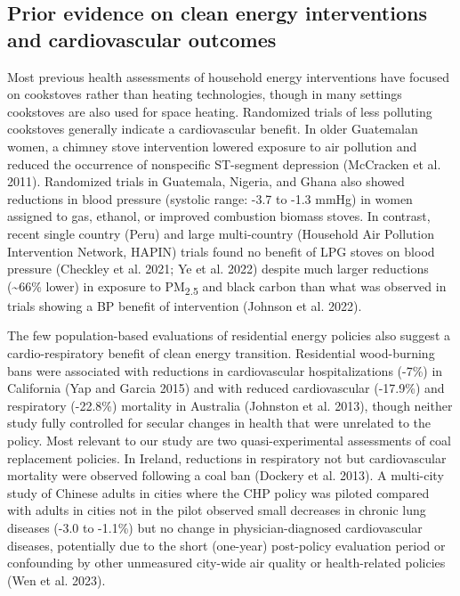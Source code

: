 \documentclass[
  letterpaper,
  DIV=11,
  numbers=noendperiod]{scrartcl}
\begin{document}
\subsection{Prior evidence on clean energy interventions and
cardiovascular
outcomes}\label{prior-evidence-on-clean-energy-interventions-and-cardiovascular-outcomes}

Most previous health assessments of household energy interventions have
focused on cookstoves rather than heating technologies, though in many
settings cookstoves are also used for space heating. Randomized trials
of less polluting cookstoves generally indicate a cardiovascular
benefit. In older Guatemalan women, a chimney stove intervention lowered
exposure to air pollution and reduced the occurrence of nonspecific
ST-segment depression (McCracken et al. 2011). Randomized trials in
Guatemala, Nigeria, and Ghana also showed reductions in blood pressure
(systolic range: -3.7 to -1.3 mmHg) in women assigned to gas, ethanol,
or improved combustion biomass stoves. In contrast, recent single
country (Peru) and large multi-country (Household Air Pollution
Intervention Network, HAPIN) trials found no benefit of LPG stoves on
blood pressure (Checkley et al. 2021; Ye et al. 2022) despite much
larger reductions (\textasciitilde66\% lower) in exposure to
PM\textsubscript{2.5} and black carbon than what was observed in trials
showing a BP benefit of intervention (Johnson et al. 2022).

The few population-based evaluations of residential energy policies also
suggest a cardio-respiratory benefit of clean energy transition.
Residential wood-burning bans were associated with reductions in
cardiovascular hospitalizations (-7\%) in California (Yap and Garcia
2015) and with reduced cardiovascular (-17.9\%) and respiratory
(-22.8\%) mortality in Australia (Johnston et al. 2013), though neither
study fully controlled for secular changes in health that were unrelated
to the policy. Most relevant to our study are two quasi-experimental
assessments of coal replacement policies. In Ireland, reductions in
respiratory not but cardiovascular mortality were observed following a
coal ban (Dockery et al. 2013). A multi-city study of Chinese adults in
cities where the CHP policy was piloted compared with adults in cities
not in the pilot observed small decreases in chronic lung diseases (-3.0
to -1.1\%) but no change in physician-diagnosed cardiovascular diseases,
potentially due to the short (one-year) post-policy evaluation period or
confounding by other unmeasured city-wide air quality or health-related
policies (Wen et al. 2023).
\end{document}

